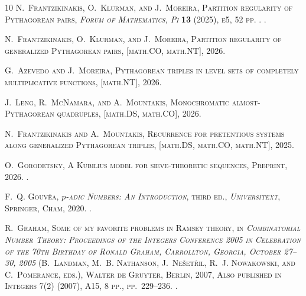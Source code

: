 \documentclass[twoside]{aomart}
\theoremstyle{paperplain}
\theoremstyle{paperdefinition}
\numberwithin{equation}{section}
\begin{document}
\begin{thebibliography}{10}
\bgroup\scshape{}N.~Frantzikinakis\egroup{},
  \bgroup\scshape{}O.~Klurman\egroup{}, and
  \bgroup\scshape{}J.~Moreira\egroup{}, Partition regularity of {P}ythagorean
  pairs,  \emph{Forum of Mathematics, Pi} \textbf{13} (2025), e5, 52 pp.
  .  .

\bgroup\scshape{}N.~Frantzikinakis\egroup{},
  \bgroup\scshape{}O.~Klurman\egroup{}, and
  \bgroup\scshape{}J.~Moreira\egroup{}, Partition regularity of generalized
  {P}ythagorean pairs,  [math.CO, math.NT], 2026.

\bgroup\scshape{}G.~Azevedo\egroup{} and
  \bgroup\scshape{}J.~Moreira\egroup{}, Pythagorean triples in level sets
  of completely multiplicative functions,  [math.NT],
  2026.

\bgroup\scshape{}J.~Leng\egroup{}, \bgroup\scshape{}R.~McNamara\egroup{}, and
  \bgroup\scshape{}A.~Mountakis\egroup{}, Monochromatic almost-Pythagorean
  quadruples,  [math.DS, math.CO], 2026.

\bgroup\scshape{}N.~Frantzikinakis\egroup{} and
  \bgroup\scshape{}A.~Mountakis\egroup{}, Recurrence for pretentious systems
  along generalized Pythagorean triples,  [math.DS, math.CO,
  math.NT], 2025.

\bgroup\scshape{}O.~Gorodetsky\egroup{}, A {K}ubilius model for sieve-theoretic
  sequences, Preprint, 2026. .

\bgroup\scshape{}F.~Q. Gouv\^ea\egroup{},
  \emph{$p$-adic Numbers: An Introduction}, third ed.,
  \emph{Universitext}, Springer, Cham, 2020.
  .

\bgroup\scshape{}R.~Graham\egroup{}, Some of my favorite problems in {Ramsey}
  theory,  in \emph{Combinatorial Number Theory: Proceedings of the {Integers
  Conference 2005} in Celebration of the 70th Birthday of Ronald Graham,
  Carrollton, Georgia, October 27--30, 2005}
  (\bgroup\scshape{}B.~Landman\egroup{}, \bgroup\scshape{}M.~B.
  Nathanson\egroup{}, \bgroup\scshape{}J.~Ne{\v{s}}et{\v{r}}il\egroup{},
  \bgroup\scshape{}R.~J. Nowakowski\egroup{}, and
  \bgroup\scshape{}C.~Pomerance\egroup{}, eds.), Walter de Gruyter, Berlin,
  2007, Also published in Integers 7(2) (2007), A15, 8 pp., pp.~229--236.
  .


\end{thebibliography}
\end{document}
